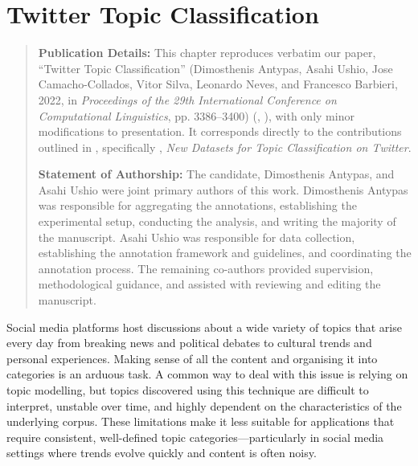 \setlength{\headheight}{15pt}
\chapter{Twitter Topic Classification}
\label{ch:tweet-topic}

\begin{quote}
\textbf{Publication Details:} This chapter reproduces verbatim our paper, ``Twitter Topic Classification'' (Dimosthenis Antypas, Asahi Ushio, Jose Camacho-Collados, Vitor Silva, Leonardo Neves, and Francesco Barbieri, 2022, in \textit{Proceedings of the 29th International Conference on Computational Linguistics}, pp. 3386–3400) (, ), with only minor modifications to presentation. It corresponds directly to the contributions outlined in , specifically , \textit{New Datasets for Topic Classification on Twitter}.

\textbf{Statement of Authorship:} The candidate, Dimosthenis Antypas, and Asahi Ushio were joint primary authors of this work. Dimosthenis Antypas was responsible for aggregating the annotations, establishing the experimental setup, conducting the analysis, and writing the majority of the manuscript. Asahi Ushio was responsible for data collection, establishing the annotation framework and guidelines, and coordinating the annotation process. The remaining co-authors provided supervision, methodological guidance, and assisted with reviewing and editing the manuscript.
\end{quote}

Social media platforms host discussions about a wide variety of topics that arise every day from breaking news and political debates to cultural trends and personal experiences. Making sense of all the content and organising it into categories is an arduous task. A common way to deal with this issue is relying on topic modelling, but topics discovered using this technique are difficult to interpret, unstable over time, and highly dependent on the characteristics of the underlying corpus. These limitations make it less suitable for applications that require consistent, well-defined topic categories—particularly in social media settings where trends evolve quickly and content is often noisy.

